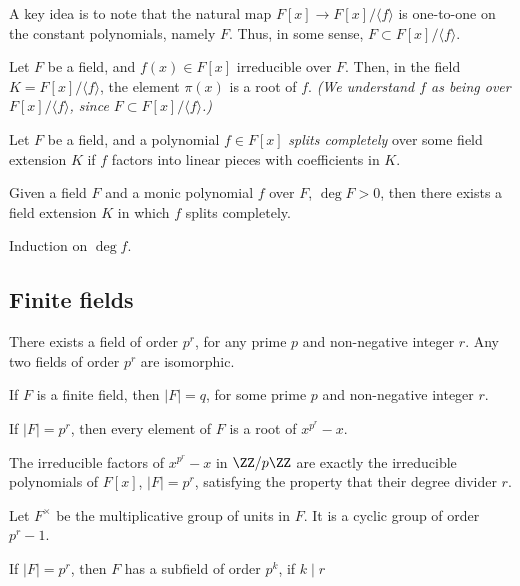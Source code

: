 
A key idea is to note that the natural map $F[x] \to F[x]/ \langle f \rangle$ is one-to-one on the constant polynomials, namely $F$. Thus, in some sense, $F \subset F[x]/ \langle f \rangle$.

\begin{lem}\label{l33:lem1}
	Let $F$ be a field, and $f(x) \in F[x]$ irreducible over $F$. Then, in the field $K = F[x] / \langle f \rangle$, the element  $\pi(x)$ is a root of $f$. \emph{(We understand $f$ as being over $F[x] / \langle f \rangle$, since $F \subset F[x]/ \langle f \rangle$.)}
\end{lem}

\begin{defn}
	Let $F$ be a field, and a polynomial $f \in F[x]$ \emph{splits completely} over some field extension $K$ if $f$ factors into linear pieces with coefficients in $K$.
\end{defn}

\begin{lem}
	Given a field $F$ and a monic polynomial $f$ over $F$, $\deg F > 0$, then there exists a field extension $K$ in which $f$ splits completely.
\end{lem}

\begin{sk}
	Induction on $\deg f$.
\end{sk}

\subsection{Finite fields}

\begin{thm}
	There exists a field of order $p^r$, for any prime $p$ and non-negative integer $r$. Any two fields of order $p^r$ are isomorphic.
\end{thm}

\begin{thm}
	If $F$ is a finite field, then $|F| = q$, for some prime $p$ and non-negative integer $r$.
\end{thm}

\begin{thm}
	If $|F| = p^r$, then every element of $F$ is a root of $x^{p^r} - x$.
\end{thm}

\begin{thm}
	The irreducible factors of $x^{p^r} - x$ in $\ZZ/p\ZZ$ are exactly the irreducible polynomials of $F[x]$, $|F| = p^r$, satisfying the property that their degree divider $r$.
\end{thm}

\begin{thm}
	Let $F^\times$ be the multiplicative group of units in $F$. It is a cyclic group of order $p^r - 1$.
\end{thm}

\begin{thm}
	If $|F| = p^r$, then $F$ has a subfield of order $p^k$, if $k \mid r$
\end{thm}

